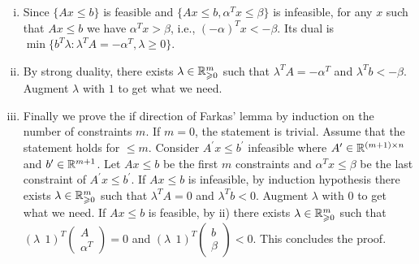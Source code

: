 \documentclass[11pt]{article}
\renewcommand{\leq}{\leqslant}
\renewcommand{\geq}{\geqslant}
\begin{document}
\begin{enumerate}[1)]
\begin{solution}
	\begin{enumerate}[i)]
		\item Since $\{Ax\leq b\}$ is feasible and $\{Ax\leq b, \alpha^T x\leq \beta\}$ is infeasible, for any $x$ such that $Ax\leq b$ we have $\alpha^T x > \beta$, i.e., $(-\alpha)^T x < -\beta$. 
		Its dual is $\min\{b^T \lambda: \lambda^T A = -\alpha^T, \lambda≥0\}$.
		\item By strong duality, there exists $\lambda \in \R^m_{\geq 0}$ such that $\lambda^T A = -\alpha^T$ and $\lambda^T b < -\beta$. Augment $\lambda$ with $1$ to get what we need.
		\item Finally we prove the if direction of Farkas' lemma by induction on the number of constraints $m$.
		If $m=0$, the statement is trivial. 
		Assume that the statement holds for $\leq m$. Consider ${A^\prime x \leq b^\prime}$ infeasible where $A^\prime \in \mathbb{R}^{(m+1)\times n}$ and $b^\prime \in \mathbb{R}^{m+1}$. Let $Ax\leq b$ be the first $m$ constraints and $\alpha^T x \leq \beta$ be the last constraint of $A^\prime x \leq b^\prime$.  
		If $Ax \leq b$ is infeasible, by induction hypothesis there exists $\lambda \in \R^m_{\geq 0}$ such that $\lambda^T A = 0$ and $\lambda^T b < 0$. Augment $\lambda$ with $0$ to get what we need. 
		If $Ax \leq b$ is feasible, by ii) there exists $\lambda \in \R^m_{\geq 0}$ such that $(\lambda \;\, 1)^T \begin{pmatrix} A \\ \alpha^T \end{pmatrix} = 0$ and $(\lambda \;\, 1)^T \begin{pmatrix} b \\ \beta \end{pmatrix} < 0$. This concludes the proof.
	\end{enumerate}
\end{solution}


\end{enumerate}



  
\end{document}
